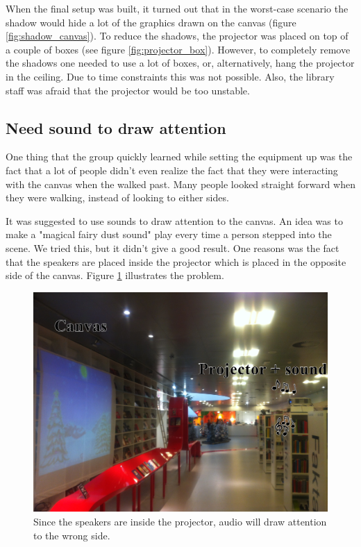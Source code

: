 When the final setup was built, it turned out that in the worst-case scenario the shadow would hide a lot of the graphics drawn on the canvas (figure \ref{fig:shadow_canvas}). To reduce the shadows, the projector was placed on top of a couple of boxes (see figure \ref{fig:projector_box}). However, to completely remove the shadows one needed to use a lot of boxes, or, alternatively, hang the projector in the ceiling. Due to time constraints this was not possible. Also, the library staff was afraid that the projector would be too unstable.

\subsection{Need sound to draw attention}
One thing that the group quickly learned while setting the equipment up was the fact that a lot of people didn't even realize the fact that they were interacting with the canvas when the walked past. Many people looked straight forward when they were walking, instead of looking to either sides.

It was suggested to use sounds to draw attention to the canvas. An idea was to make a "magical fairy dust sound" play every time a person stepped into the scene. We tried this, but it didn't give a good result. One reasons was the fact that the speakers are placed inside the projector which is placed in the opposite side of the canvas. Figure \ref{fig:projector_audio} illustrates the problem.

\begin{figure}[htbp]
\centering
\includegraphics[width=1.0\textwidth]{Pictures/Design/projector_audio}
\caption{Since the speakers are inside the projector, audio will draw attention to the wrong side.}
\label{fig:projector_audio}
\end{figure}

